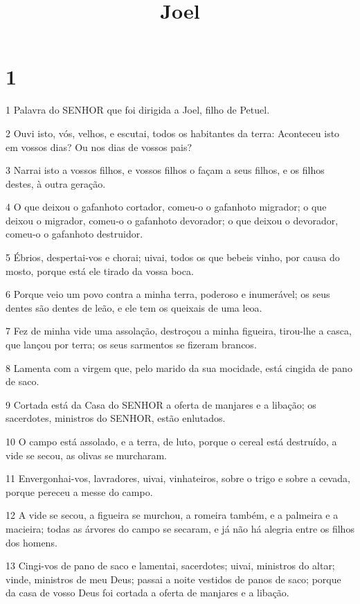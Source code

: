 

\title{Joel}


\chapter{1}

\par 1 Palavra do SENHOR que foi dirigida a Joel, filho de Petuel.
\par 2 Ouvi isto, vós, velhos, e escutai, todos os habitantes da terra: Aconteceu isto em vossos dias? Ou nos dias de vossos pais?
\par 3 Narrai isto a vossos filhos, e vossos filhos o façam a seus filhos, e os filhos destes, à outra geração.
\par 4 O que deixou o gafanhoto cortador, comeu-o o gafanhoto migrador; o que deixou o migrador, comeu-o o gafanhoto devorador; o que deixou o devorador, comeu-o o gafanhoto destruidor.
\par 5 Ébrios, despertai-vos e chorai; uivai, todos os que bebeis vinho, por causa do mosto, porque está ele tirado da vossa boca.
\par 6 Porque veio um povo contra a minha terra, poderoso e inumerável; os seus dentes são dentes de leão, e ele tem os queixais de uma leoa.
\par 7 Fez de minha vide uma assolação, destroçou a minha figueira, tirou-lhe a casca, que lançou por terra; os seus sarmentos se fizeram brancos.
\par 8 Lamenta com a virgem que, pelo marido da sua mocidade, está cingida de pano de saco.
\par 9 Cortada está da Casa do SENHOR a oferta de manjares e a libação; os sacerdotes, ministros do SENHOR, estão enlutados.
\par 10 O campo está assolado, e a terra, de luto, porque o cereal está destruído, a vide se secou, as olivas se murcharam.
\par 11 Envergonhai-vos, lavradores, uivai, vinhateiros, sobre o trigo e sobre a cevada, porque pereceu a messe do campo.
\par 12 A vide se secou, a figueira se murchou, a romeira também, e a palmeira e a macieira; todas as árvores do campo se secaram, e já não há alegria entre os filhos dos homens.
\par 13 Cingi-vos de pano de saco e lamentai, sacerdotes; uivai, ministros do altar; vinde, ministros de meu Deus; passai a noite vestidos de panos de saco; porque da casa de vosso Deus foi cortada a oferta de manjares e a libação.
